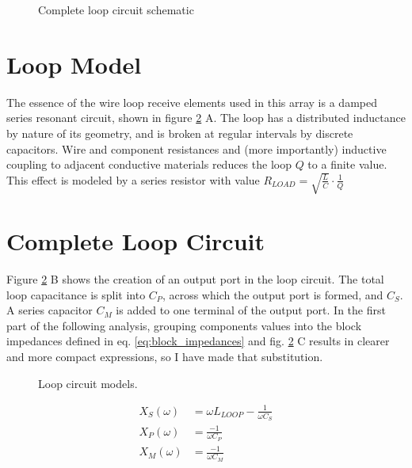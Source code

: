 \begin{figure}
    \centering
    
    \caption{Complete loop circuit schematic}
    \label{fig:loop_schematic}
\end{figure}

\section{Loop Model}
The essence of the wire loop receive elements used in this array is a damped series resonant circuit, shown in figure
\ref{fig:loop_model} A. The loop has a distributed inductance by nature of its geometry, and is broken at regular
intervals by discrete capacitors.  Wire and component resistances and (more importantly) inductive coupling to adjacent
conductive materials reduces the loop $Q$ to a finite value. This effect is modeled by a series resistor with value
$R_{LOAD}=\sqrt{\frac{L}{C}}\cdot\frac{1}{Q}$

\section{Complete Loop Circuit}
Figure \ref{fig:loop_model} B shows the creation of an output port in the loop circuit. The total loop capacitance is
split into $C_P$, across which the output port is formed, and $C_S$. A series capacitor $C_M$ is added to one terminal
of the output port. In the first part of the following analysis, grouping components values into the block impedances
defined in eq. \ref{eq:block_impedances} and fig. \ref{fig:loop_model} C results in clearer and more compact
expressions, so I have made that substitution.

\begin{figure}
    \centering
    
    \caption{Loop circuit models.}
    \label{fig:loop_model}
\end{figure}

\begin{equation}\label{eq:block_impedances}
    \begin{aligned}
        X_S(\omega) &= \omega L_{LOOP} - \frac{1}{\omega C_S}\\
        X_P(\omega) &= \frac{-1}{\omega C_P}\\
        X_M(\omega) &= \frac{-1}{\omega C_M}\\
    \end{aligned}
\end{equation}

